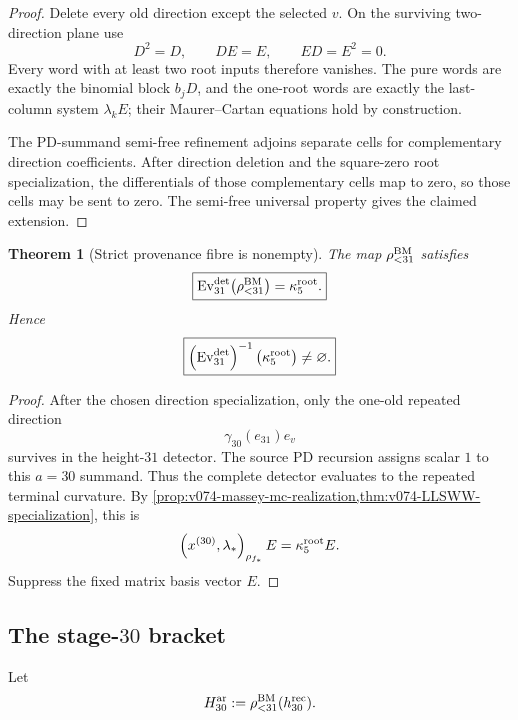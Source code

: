 \documentclass[11pt]{article}
\newtheorem{theorem}{Theorem}[section]
\theoremstyle{remark}
\begin{document}
\begin{proof}
Delete every old direction except the selected \(v\).  On the surviving
two-direction plane use
\[
 D^2=D,\qquad DE=E,\qquad ED=E^2=0.
\]
Every word with at least two root inputs therefore vanishes.  The pure words
are exactly the binomial block \(b_jD\), and the one-root words are exactly
the last-column system \(\lambda_kE\); their Maurer--Cartan equations hold
by construction.

The PD-summand semi-free refinement adjoins separate cells for complementary
direction coefficients.  After direction deletion and the square-zero root
specialization, the differentials of those complementary cells map to zero,
so those cells may be sent to zero.  The semi-free universal property gives
the claimed extension.
\end{proof}

\begin{theorem}[Strict provenance fibre is nonempty]
\label{thm:v074-provenance-fiber-closed}
The map \(\rho_{<31}^{\rm BM}\) satisfies
\begin{equation}
 \boxed{
 \operatorname{Ev}_{31}^{\det}
 \bigl(\rho_{<31}^{\rm BM}\bigr)
 =
 \kappa_5^{\rm root}.}
 \label{eq:v074-Ev-equals-kappa}
\end{equation}
Hence
\begin{equation}
 \boxed{
 \left(
 \operatorname{Ev}_{31}^{\det}
 \right)^{-1}
 \bigl(\kappa_5^{\rm root}\bigr)
 \ne\varnothing.}
 \label{eq:v074-fiber-nonempty}
\end{equation}
\end{theorem}

\begin{proof}
After the chosen direction specialization, only the one-old repeated
direction
\[
 \gamma_{30}(e_{31})e_v
\]
survives in the height-\(31\) detector.  The source PD recursion assigns
scalar \(1\) to this \(a=30\) summand.  Thus the complete detector evaluates to
the repeated terminal curvature.  By
\cref{prop:v074-massey-mc-realization,thm:v074-LLSWW-specialization}, this is
\[
 \left(
 x^{(30)},\lambda_*
 \right)_{\rho_{f_*}}E
 =
 \kappa_5^{\rm root}E.
\]
Suppress the fixed matrix basis vector \(E\).
\end{proof}

\subsection{The stage-\texorpdfstring{\(30\)}{30} bracket}

Let
\[
 H_{30}^{\rm ar}:=
 \rho_{<31}^{\rm BM}(h_{30}^{\rm rec}).
\]
\end{document}
